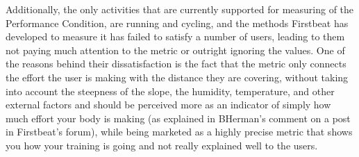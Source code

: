 Additionally, the only activities that are currently supported for measuring of the Performance Condition, are running and cycling,
and the methods Firstbeat has developed to measure it has failed to satisfy a number of users, leading to them not paying much attention to the metric or outright ignoring the values.\cite{performance-condition-unreliable1}\cite{performance-condition-unreliable-reasoning}
One of the reasons behind their dissatisfaction is the fact that the metric only connects the effort the user is making with the distance they are covering,
 without taking into account the steepness of the slope, the humidity, temperature, and other external factors 
 and should be perceived more as an indicator of simply how much effort your body is making (as explained in BHerman's comment on a post\cite{performance-condition-unreliable-reasoning} in Firstbeat's forum), 
while being marketed as a highly precise metric that shows you how your training is going and not really explained well to the users.
